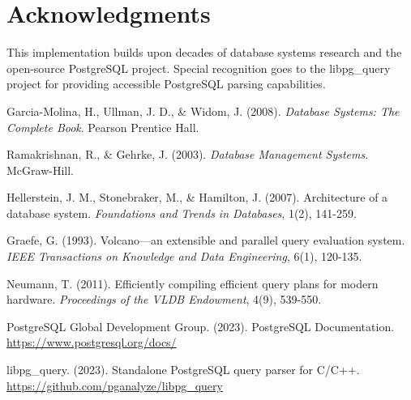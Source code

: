 \documentclass[12pt,a4paper]{article}
\begin{document}
\section{Acknowledgments}

This implementation builds upon decades of database systems research and the open-source PostgreSQL project. Special recognition goes to the libpg\_query project for providing accessible PostgreSQL parsing capabilities.


\begin{thebibliography}{99}

Garcia-Molina, H., Ullman, J. D., \& Widom, J. (2008). 
\textit{Database Systems: The Complete Book}. 
Pearson Prentice Hall.

Ramakrishnan, R., \& Gehrke, J. (2003). 
\textit{Database Management Systems}. 
McGraw-Hill.

Hellerstein, J. M., Stonebraker, M., \& Hamilton, J. (2007). 
Architecture of a database system. 
\textit{Foundations and Trends in Databases}, 1(2), 141-259.

Graefe, G. (1993). 
Volcano—an extensible and parallel query evaluation system. 
\textit{IEEE Transactions on Knowledge and Data Engineering}, 6(1), 120-135.

Neumann, T. (2011). 
Efficiently compiling efficient query plans for modern hardware. 
\textit{Proceedings of the VLDB Endowment}, 4(9), 539-550.

PostgreSQL Global Development Group. (2023). 
PostgreSQL Documentation. 
\url{https://www.postgresql.org/docs/}

libpg\_query. (2023). 
Standalone PostgreSQL query parser for C/C++. 
\url{https://github.com/pganalyze/libpg_query}

\end{thebibliography}
\end{document}
